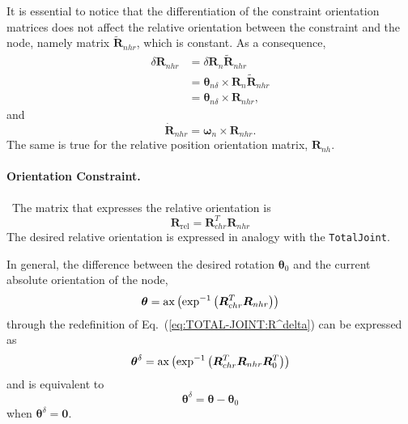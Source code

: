 \documentclass[10pt,fleqn,subeqn]{report}
\newcommand{\T}[1]{\bm{#1}}
\begin{document}
It is essential to notice that the differentiation of the constraint
orientation matrices does not affect the relative orientation between
the constraint and the node, namely matrix $\tilde{\T{R}}_{nhr}$,
which is constant.
As a consequence,
\begin{align}
	\delta\T{R}_{nhr}
		&= \delta\T{R}_n \tilde{\T{R}}_{nhr} \nonumber \\
		&= \T{\theta}_{n\delta} \times \T{R}_n \tilde{\T{R}}_{nhr}
		\nonumber \\
		&= \T{\theta}_{n\delta}\times \T{R}_{nhr} ,
\end{align}
and
\begin{equation}
	\dot{\T{R}}_{nhr} = \T{\omega}_n \times \T{R}_{nhr} .
\end{equation}
The same is true for the relative position orientation matrix,
$\T{R}_{nh}$.


\paragraph{Orientation Constraint.} \
The matrix that expresses the relative orientation is
\begin{equation}
	\T{R}_{\mathrm{rel}} = \T{R}_{chr}^T \T{R}_{nhr}
\end{equation}
The desired relative orientation is expressed in analogy 
with the \texttt{TotalJoint}.

In general, the difference between the desired rotation
$\T{\theta}_0$ and the current absolute orientation of the node,
\begin{equation}
	\T{\theta} = \llk{ax}\plbr{\exp^{-1}\plbr{
		\T{R}_{chr}^T \T{R}_{nhr}
	}}
\end{equation}
through the redefinition of Eq.~(\ref{eq:TOTAL-JOINT:R^delta}) 
can be expressed as
\begin{equation}
	\T{\theta}^{\delta} = \llk{ax}\plbr{\exp^{-1}\plbr{
		\T{R}_{chr}^T \T{R}_{nhr} \T{R}_0^T
	}}
	\label{eq:TOTAL-PIN-JOINT:thetadelta}
\end{equation}
and is equivalent to
\begin{equation}
	\T{\theta}^{\delta} = \T{\theta} - \T{\theta}_0
\end{equation}
when $\T{\theta}^{\delta}=\T{0}$.
\end{document}
